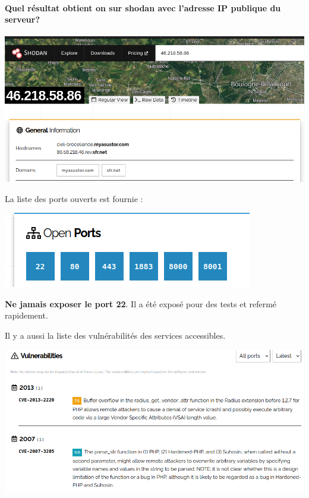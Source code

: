\documentclass[french, 12pt]{article}%
\begin{document}
\paragraph{Quel résultat obtient on sur shodan avec l'adresse IP publique du serveur?}
\begin{center}
\includegraphics[scale=0.4]{./ressource/shodan}
\end{center}


La liste des ports ouverts est fournie : 

\begin{center}
\includegraphics[scale=0.7]{./ressource/shodanPortouvert}
\end{center}

\textbf{Ne jamais exposer le port 22}. Il a été exposé pour des tests et refermé rapidement.


Il y a aussi la liste des vulnérabilités des services accessibles.
\begin{center}
\includegraphics[scale=0.7]{./ressource/shodanVuln}
\end{center}
\end{document}
